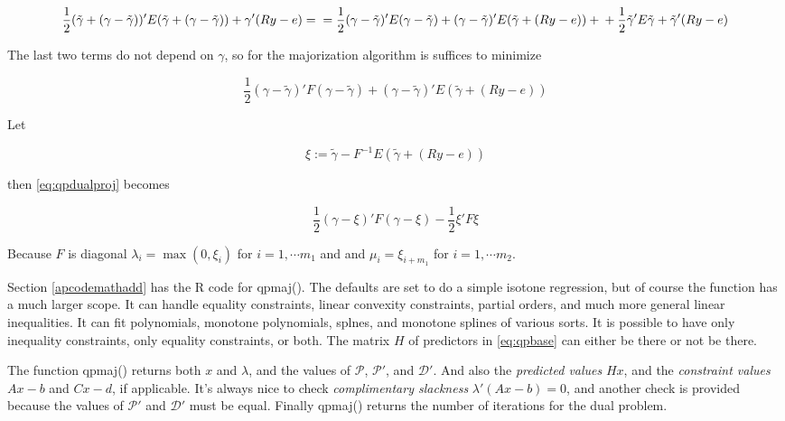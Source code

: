 \documentclass[
  12pt,
]{book}
\theoremstyle{definition}
\theoremstyle{definition}
\theoremstyle{definition}
\theoremstyle{definition}
\theoremstyle{remark}
\begin{document}
\begin{equation}
\frac12 (\tilde\gamma+(\gamma-\tilde\gamma))'E(\tilde\gamma+(\gamma-\tilde\gamma))+\gamma'(Ry-e)=\\
=\frac12(\gamma-\tilde\gamma)'E(\gamma-\tilde\gamma)+ (\gamma-\tilde\gamma)'E(\tilde\gamma+(Ry-e))+\\+\frac12\tilde\gamma'E\tilde\gamma+\tilde\gamma'(Ry-e)
\label{eq:qpdualcomp}
\end{equation}

The last two terms do not depend on \(\gamma\), so for the majorization algorithm is suffices to minimize

\begin{equation}
\frac12(\gamma-\tilde\gamma)'F(\gamma-\tilde\gamma)+ (\gamma-\tilde\gamma)'E(\tilde\gamma+(Ry-e))
\label{eq:qpdualproj}
\end{equation}

Let

\begin{equation}
\xi:=\tilde\gamma-F^{-1}E(\tilde\gamma+(Ry-e))
\label{eq:qpdefxi}
\end{equation}

then \eqref{eq:qpdualproj} becomes

\begin{equation}
\frac12(\gamma-\xi)'F(\gamma-\xi)-\frac12\xi'F\xi
\label{eq:qpdualsimp}
\end{equation}

Because \(F\) is diagonal \(\lambda_i=\max(0,\xi_i)\) for \(i=1,\cdots m_1\) and
and \(\mu_i=\xi_{i+m_1}\) for \(i=1,\cdots m_2\).

Section \ref{apcodemathadd} has the R code for qpmaj(). The defaults are set to do a simple isotone regression, but of course the function has a much larger scope. It can handle equality constraints, linear convexity constraints, partial orders, and much more general linear inequalities. It can fit polynomials, monotone polynomials, splnes, and monotone splines of various sorts. It is possible to have only inequality constraints, only equality constraints, or both. The matrix \(H\) of predictors in \eqref{eq:qpbase} can either be there or not be there.

The function qpmaj() returns both \(x\) and \(\lambda\), and the values of \(\mathcal{P}\), \(\mathcal{P}'\), and \(\mathcal{D}'\).
And also the \emph{predicted values} \(Hx\), and the \emph{constraint values} \(Ax-b\) and \(Cx-d\), if applicable. It's always nice to check \emph{complimentary slackness}
\(\lambda'(Ax-b)=0\), and another check is provided because the values of
\(\mathcal{P}'\) and \(\mathcal{D}'\) must be equal. Finally qpmaj() returns the number of iterations for the dual problem.
\end{document}
